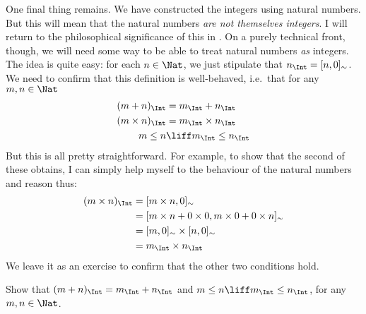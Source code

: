\documentclass[../../../include/open-logic-section]{subfiles}
\begin{document}
One final thing remains. We have constructed the integers using natural numbers. But this will mean that the natural numbers \emph{are not themselves integers}. I will return to the philosophical significance of this in . On a purely technical front, though, we will need some way to be able to treat natural numbers \emph{as} integers. The idea is quite easy: for each $n \in \Nat$, we just stipulate that $n_\Int = \equivrep{n, 0}{\Intequiv}$. We need to confirm that this definition is well-behaved, i.e.\ that for any $m, n \in \Nat$
\begin{align*}
	(m + n)_\Int &= m_\Int + n_\Int\\
	(m \times n)_\Int &= m_\Int \times n_\Int\\
	m \leq n &\liff m_\Int \leq n_\Int
\end{align*}
But this is all pretty straightforward. For example, to show that the second of these obtains, I can simply help myself to the behaviour of the natural numbers and reason thus:
	\begin{align*}
		(m \times n)_\Int  &= \equivrep{m \times n, 0}{\Intequiv} \\
		&= \equivrep{m \times n + 0 \times 0, m \times 0 + 0 \times n}{\Intequiv} \\
		&= \equivrep{m, 0}{\Intequiv} \times \equivrep{n, 0}{\Intequiv} \\
		&= m_\Int \times n_\Int
	\end{align*}
We leave it as an exercise to confirm that the other two conditions hold.
\begin{prob}
	Show that $(m + n)_\Int = m_\Int + n_\Int$ and $m \leq n \liff m_\Int \leq n_\Int$, for any $m, n \in \Nat$.
\end{prob}
\end{document}
